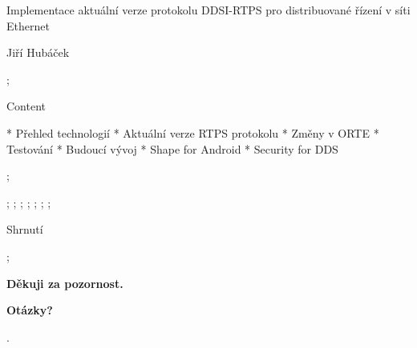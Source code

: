 

\worktype[M/CZ]

\slideshow

\tit Implementace aktuální verze protokolu DDSI-RTPS pro distribuované řízení v síti Ethernet

\subtit Jiří Hubáček

\pg;


\sec Content

* Přehled technologií
* Aktuální verze RTPS protokolu
* Změny v ORTE
* Testování
* Budoucí vývoj
* Shape for Android
* Security for DDS

\pg;

 \pg;
 \pg;
 \pg;
 \pg;
 \pg;
 \pg;
 \pg;


\sec Shrnutí

\pg;

\null
\vskip2cm
\centerline{\typosize[35/40]\bf Děkuji za pozornost.}

\vskip2cm
\centerline{\Blue\typosize[60/70]\bf Otázky?}

\pg.
